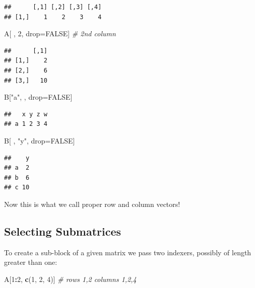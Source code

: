 \documentclass[10pt,b5paper,krantz1]{krantz}
\newenvironment{Shaded}{\begin{snugshade}}{\end{snugshade}}
\newcommand{\CommentTok}[1]{\textcolor[rgb]{0.37,0.37,0.37}{\textit{#1}}}
\newcommand{\DecValTok}[1]{\textcolor[rgb]{0.06,0.06,0.06}{#1}}
\newcommand{\KeywordTok}[1]{\textcolor[rgb]{0.27,0.27,0.27}{\textbf{#1}}}
\newcommand{\NormalTok}[1]{#1}
\newcommand{\OperatorTok}[1]{\textcolor[rgb]{0.43,0.43,0.43}{\textbf{#1}}}
\newcommand{\OtherTok}[1]{\textcolor[rgb]{0.37,0.37,0.37}{#1}}
\newcommand{\StringTok}[1]{\textcolor[rgb]{0.5,0.5,0.5}{#1}}
\begin{document}
\begin{verbatim}
##      [,1] [,2] [,3] [,4]
## [1,]    1    2    3    4
\end{verbatim}

\begin{Shaded}
\begin{Highlighting}[]
\NormalTok{A[   ,   }\DecValTok{2}\NormalTok{, drop=}\OtherTok{FALSE}\NormalTok{] }\CommentTok{# 2nd column}
\end{Highlighting}
\end{Shaded}

\begin{verbatim}
##      [,1]
## [1,]    2
## [2,]    6
## [3,]   10
\end{verbatim}

\begin{Shaded}
\begin{Highlighting}[]
\NormalTok{B[}\StringTok{"a"}\NormalTok{,    , drop=}\OtherTok{FALSE}\NormalTok{]}
\end{Highlighting}
\end{Shaded}

\begin{verbatim}
##   x y z w
## a 1 2 3 4
\end{verbatim}

\begin{Shaded}
\begin{Highlighting}[]
\NormalTok{B[   , }\StringTok{"y"}\NormalTok{, drop=}\OtherTok{FALSE}\NormalTok{]}
\end{Highlighting}
\end{Shaded}

\begin{verbatim}
##    y
## a  2
## b  6
## c 10
\end{verbatim}

Now this is what we call proper row and column vectors!

\hypertarget{selecting-submatrices}{%
\subsection{Selecting Submatrices}\label{selecting-submatrices}}

To create a sub-block of a given matrix we pass two indexers,
possibly of length greater than one:

\begin{Shaded}
\begin{Highlighting}[]
\NormalTok{A[}\DecValTok{1}\OperatorTok{:}\DecValTok{2}\NormalTok{, }\KeywordTok{c}\NormalTok{(}\DecValTok{1}\NormalTok{, }\DecValTok{2}\NormalTok{, }\DecValTok{4}\NormalTok{)] }\CommentTok{# rows 1,2 columns 1,2,4}
\end{Highlighting}
\end{Shaded}
\end{document}
